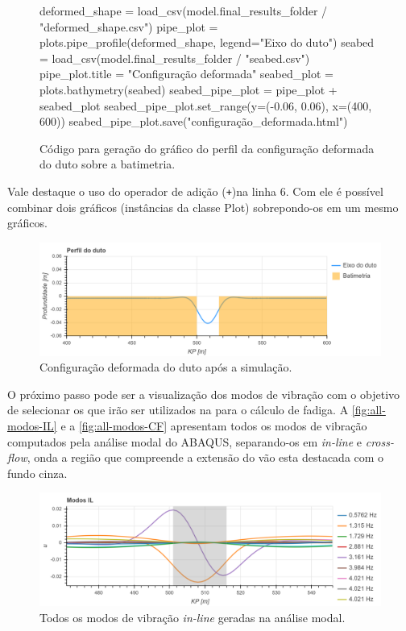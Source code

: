 \begin{figure}[!ht]
\caption{Código para geração do gráfico do perfil da configuração deformada do duto sobre a batimetria.}\label{code:deformada}
\begin{pythoncode}
deformed_shape = load_csv(model.final_results_folder / "deformed_shape.csv")
pipe_plot = plots.pipe_profile(deformed_shape, legend="Eixo do duto")
seabed = load_csv(model.final_results_folder / "seabed.csv")
pipe_plot.title = "Configuração deformada"
seabed_plot = plots.bathymetry(seabed)
seabed_pipe_plot = pipe_plot + seabed_plot
seabed_pipe_plot.set_range(y=(-0.06, 0.06), x=(400, 600))
seabed_pipe_plot.save("configuração_deformada.html")
\end{pythoncode}
\end{figure}

Vale destaque o uso do operador de adição (\texttt{+})na linha 6. Com ele é possível combinar dois gráficos (instâncias da classe Plot) sobrepondo-os em um mesmo gráficos.

\begin{figure}[!ht]
	\centering
	\caption{Configuração deformada do duto após a simulação.}\label{fig:ex-config-deformada}
	\includegraphics[width=\textwidth]{imagens/exemplo/deformada}
\end{figure}

O próximo passo pode ser a visualização dos modos de vibração com o objetivo de selecionar os que irão ser utilizados na para o cálculo de fadiga. A \autoref{fig:all-modos-IL} e a \autoref{fig:all-modos-CF} apresentam todos os modos de vibração computados pela análise modal do ABAQUS, separando-os em \textit{in-line} e \textit{cross-flow}, onda a região que compreende a extensão do vão esta destacada com o fundo cinza.

\begin{figure}[H]
	\centering
	\caption{Todos os modos de vibração \textit{in-line} geradas na análise modal.}\label{fig:all-modos-IL}
	\includegraphics[width=\textwidth]{imagens/exemplo/all_modos_IL}
\end{figure}

